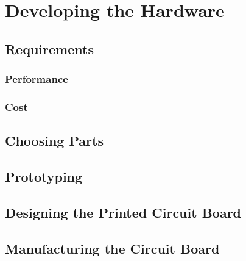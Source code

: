 \chapter{Developing the Hardware} %

\label{Chapter4} %


\section{Requirements}

\todosection


\subsection{Performance}

\todosection


\subsection{Cost}

\todosection


\section{Choosing Parts}

\todosection


\section{Prototyping}

\todosection


\section{Designing the Printed Circuit Board}

\todosection


\section{Manufacturing the Circuit Board}

\todosection